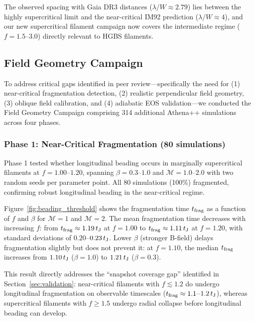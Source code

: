 \documentclass[twoside,twocolumn]{mnras}
\begin{document}
The observed spacing with Gaia DR3 distances ($\lambda/W \approx 2.79$) lies between the highly supercritical limit and the near-critical IM92 prediction ($\lambda/W \approx 4$), and our new supercritical filament campaign now covers the intermediate regime ($f = 1.5$--$3.0$) directly relevant to HGBS filaments.

\subsection{Field Geometry Campaign}
\label{sec:fieldgeo}

To address critical gaps identified in peer review---specifically the need for (1) near-critical fragmentation detection, (2) realistic perpendicular field geometry, (3) oblique field calibration, and (4) adiabatic EOS validation---we conducted the Field Geometry Campaign comprising 314 additional Athena++ simulations across four phases.

\subsubsection{Phase 1: Near-Critical Fragmentation (80 simulations)}

Phase 1 tested whether longitudinal beading occurs in marginally supercritical filaments at $f = 1.00$--$1.20$, spanning $\beta = 0.3$--$1.0$ and $\mathcal{M} = 1.0$--$2.0$ with two random seeds per parameter point. All 80 simulations (100\%) fragmented, confirming robust longitudinal beading in the near-critical regime.

Figure~\ref{fig:beading_threshold} shows the fragmentation time $t_{\rm frag}$ as a function of $f$ and $\beta$ for $\mathcal{M} = 1$ and $\mathcal{M} = 2$. The mean fragmentation time decreases with increasing $f$: from $t_{\rm frag} \approx 1.19\,t_{\rm J}$ at $f = 1.00$ to $t_{\rm frag} \approx 1.11\,t_{\rm J}$ at $f = 1.20$, with standard deviations of $0.20$--$0.23\,t_{\rm J}$. Lower $\beta$ (stronger B-field) delays fragmentation slightly but does not prevent it: at $f = 1.10$, the median $t_{\rm frag}$ increases from $1.10\,t_{\rm J}$ ($\beta = 1.0$) to $1.21\,t_{\rm J}$ ($\beta = 0.3$).

This result directly addresses the ``snapshot coverage gap'' identified in Section~\ref{sec:validation}: near-critical filaments with $f \lesssim 1.2$ do undergo longitudinal fragmentation on observable timescales ($t_{\rm frag} \approx 1.1$--$1.2\,t_{\rm J}$), whereas supercritical filaments with $f \geq 1.5$ undergo radial collapse before longitudinal beading can develop.
\end{document}
